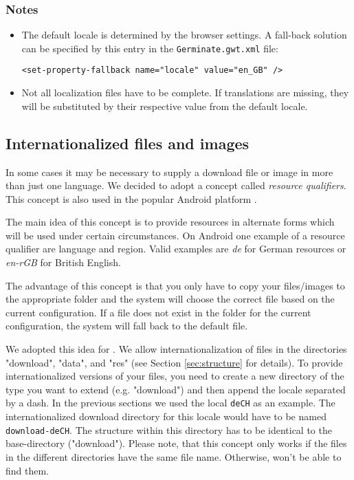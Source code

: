 \subsubsection{Notes}
\begin{itemize}
    \item The default locale is determined by the browser settings. A fall-back solution can be specified by this entry in the \texttt{Germinate.gwt.xml} file:
            \begin{lstlisting}[style=Xml]
<set-property-fallback name="locale" value="en_GB" />
            \end{lstlisting}
    \item Not all localization files have to be complete. If translations are missing, they will be substituted by their respective value from the default locale.
\end{itemize}

\subsection{Internationalized files and images}
\label{sec:localized-files}
In some cases it may be necessary to supply a download file or image in more than just one language. We decided to adopt a concept called \textit{resource qualifiers}. This concept is also used in the popular Android platform \cite{ResourceQualifiers}.

The main idea of this concept is to provide resources in alternate forms which will be used under certain circumstances. On Android one example of a resource qualifier are language and region. Valid examples are \textit{de} for German resources or \textit{en-rGB} for British English.

The advantage of this concept is that you only have to copy your files/images to the appropriate folder and the system will choose the correct file based on the current configuration. If a file does not exist in the folder for the current configuration, the system will fall back to the default file.

We adopted this idea for {\germinate}. We allow internationalization of files in the directories "download", "data", and "res" (see Section \ref{sec:structure} for details). To provide internationalized versions of your files, you need to create a new directory of the type you want to extend (e.g. "download") and then append the locale separated by a dash. In the previous sections we used the local \texttt{de\textunderscore CH} as an example. The internationalized download directory for this locale would have to be named \texttt{download-de\textunderscore CH}. The structure within this directory has to be identical to the base-directory ("download"). Please note, that this concept only works if the files in the different directories have the same file name. Otherwise, {\germinate} won't be able to find them.

